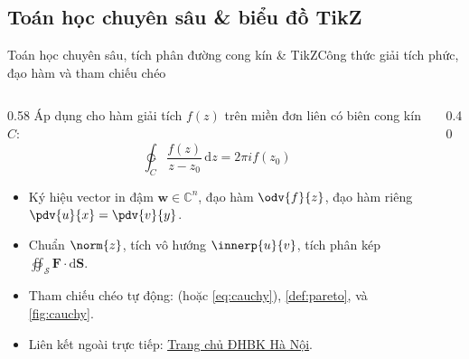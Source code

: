\documentclass[aspectratio=43,10pt]{beamer}
\begin{document}
\subsection{Toán học chuyên sâu \& biểu đồ TikZ}
\begin{frame}{Toán học chuyên sâu, tích phân đường cong kín \& TikZ}{Công thức giải tích phức, đạo hàm và tham chiếu chéo}
  \small
  \begin{columns}[c]
    \begin{column}{0.58\textwidth}
      Áp dụng cho hàm giải tích $f(z)$ trên miền đơn liên có biên cong kín $C$:
      \begin{equation}
        \ointctrclockwise_{C} \frac{f(z)}{z - z_0}\,\mathrm{d}z = 2\pi i f(z_0) \label{eq:cauchy}
      \end{equation}
      \begin{itemize}\setlength{\itemsep}{2pt}
        \item Ký hiệu vector in đậm $\bm{w} \in \mathbb{C}^n$, đạo hàm $\odv{f}{z}$, đạo hàm riêng $\pdv{u}{x} = \pdv{v}{y}$.
        \item Chuẩn $\norm{z}$, tích vô hướng $\innerp{u}{v}$, tích phân kép $\oiint_{\mathcal{S}} \bm{F}\cdot\mathrm{d}\bm{S}$.
        \item Tham chiếu chéo tự động:  (hoặc \eqref{eq:cauchy}), \cref{def:pareto}, và \cref{fig:cauchy}.
        \item Liên kết ngoài trực tiếp: \href{https://hust.edu.vn}{\underline{Trang chủ ĐHBK Hà Nội}}.
      \end{itemize}
    \end{column}
    \begin{column}{0.40\textwidth}
      \centering
      \vskip 2pt
      \label{fig:cauchy}
    \end{column}
  \end{columns}
\end{frame}
\end{document}
